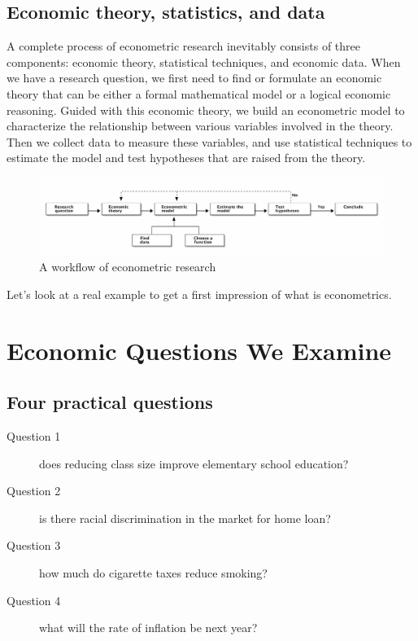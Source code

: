 \documentclass[a4paper,11pt]{article}
\begin{document}
\subsection{Economic theory, statistics, and data}
\label{sec:orgac0f946}

A complete process of econometric research inevitably consists of three
components: economic theory, statistical techniques, and economic
data. When we have a research question, we first need to find or
formulate an economic theory that can be either a formal mathematical
model or a logical economic reasoning. Guided with this economic
theory, we build an econometric model to characterize the relationship
between various variables involved in the theory. Then we collect data
to measure these variables, and use statistical techniques to estimate
the model and test hypotheses that are raised from the theory.

\begin{figure}[htbp]
\centering
\includegraphics[width=1.0\textwidth]{figure/econometric_workflow.png}
\caption{A workflow of econometric research}
\end{figure}

Let's look at a real example to get a first impression of what is
econometrics.


\section{Economic Questions We Examine}
\label{sec:org0593572}

\subsection{Four practical questions}
\label{sec:org09f75b3}

\begin{description}
\item[{Question 1}] does reducing class size improve elementary school education?

\item[{Question 2}] is there racial discrimination in the market for home loan?

\item[{Question 3}] how much do cigarette taxes reduce smoking?

\item[{Question 4}] what will the rate of inflation be next year?
\end{description}
\end{document}
